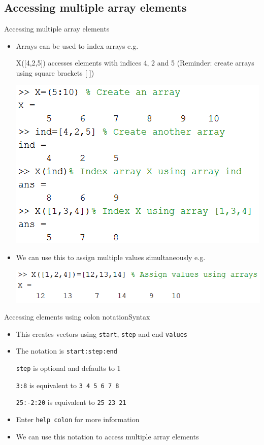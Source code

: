 \documentclass{beamer}
\begin{document}
\subsection{Accessing multiple array elements}
\begin{frame}{Accessing multiple array elements}
	\begin{itemize}
		\item Arrays can be used to index arrays e.g.
		
		X([4,2,5]) accesses elements with indices 4, 2 and 5
		(Reminder: create arrays using square brackets [ ])
		
		\includegraphics[scale=0.6]{array_access_array_index}
		
		\item We can use this to assign multiple values simultaneously e.g.
		
		\includegraphics[scale=0.6]{array_assign_array_index}
	\end{itemize}
\end{frame}

\begin{frame}{Accessing elements using colon notation}{Syntax}
	\begin{itemize}
		\item This creates vectors using \texttt{start}, \texttt{step} and end \texttt{values}
		\item The notation is \texttt{start:step:end}

		\texttt{step} is optional and defaults to 1
		
		\texttt{3:8} is equivalent to \texttt{3 4 5 6 7 8}
		
		\texttt{25:-2:20} is equivalent to \texttt{25 23 21}
		\item Enter \texttt{help colon} for more information
		\item We can use this notation to access multiple array elements
	\end{itemize}
\end{frame}
\end{document}
